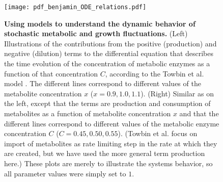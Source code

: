 \begin{figure}
	\centering
	\texttt{[image: pdf\_benjamin\_ODE\_relations.pdf]}
	\caption{ 
		\textbf{Using models to understand the dynamic behavior of stochastic metabolic and growth fluctuations.}
		(Left) Illustrations of the contributions from the positive (production) and negative (dilution) terms to the differential equation that describes the time evolution of the concentration of metabolic enzymes as a function of that concentration $C$, according to the Towbin et al. model \cite{Towbin2017}. The different lines correspond to different values of the metabolite concentration $x$ ($x={0.9, 1.0, 1.1}$). 
		(Right)	Similar as on the left, except that the terms are production and consumption of metabolites as a function of metabolite concentration $x$ and that the different lines correspond to different values of the metabolic enzyme concentration $C$ ($C={0.45,0.50,0.55}$). (Towbin et al. focus on import of metabolites as rate limiting step in the rate at which they are created, but we have used the more general term production here.) 
		These plots are merely to illustrate the systems behavior, so all parameter values were simply set to $1$.
	}
	\label{fig:CRP:benjamin_ODEs}
\end{figure}






